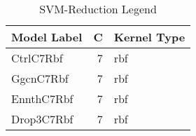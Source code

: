 \begin{table}
\centering
\caption{SVM-Reduction Legend}
\label{tab:SVM-Reduction_legend}
\begin{tabular}{lrl}
\toprule
Model Label & C & Kernel Type \\
\midrule
CtrlC7Rbf & 7 & rbf \\
GgcnC7Rbf & 7 & rbf \\
EnnthC7Rbf & 7 & rbf \\
Drop3C7Rbf & 7 & rbf \\
\bottomrule
\end{tabular}
\end{table}
